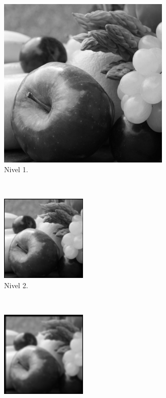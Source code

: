 \documentclass[12pt, letterpaper]{article}
\begin{document}
\begin{figure}[H]
  \centering
  \begin{subfigure}[t]{0.48\textwidth}
    \centering
    \includegraphics[width = 0.9\textwidth]{frutas/gp1.png}
    \caption{Nivel 1.}
  \end{subfigure}
  ~ 
  \begin{subfigure}[t]{0.48\textwidth}
      \centering
      \includegraphics[width = 0.45\textwidth]{frutas/gp2.png}
      \caption{Nivel 2.}
  \end{subfigure}
  ~ 
  \begin{subfigure}[t]{0.32\textwidth}
      \centering
      \includegraphics[width = 0.45\textwidth]{frutas/gp3.png}

\end{subfigure}
\end{figure}
\end{document}
